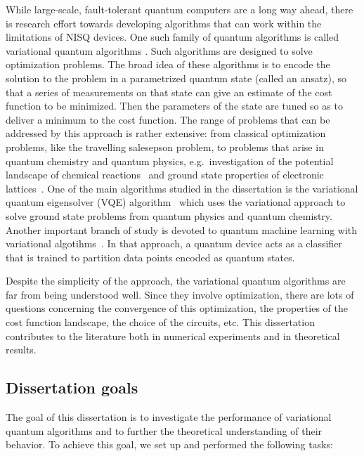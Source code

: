 While large-scale, fault-tolerant quantum computers are a long way ahead, there is research effort towards developing algorithms that can work within the limitations of NISQ devices. One such family of quantum algorithms is called variational quantum algorithms \cite{cerezo_variational_2020}. Such algorithms are designed to solve optimization problems. The broad idea of these algorithms is to encode the solution to the problem in a parametrized quantum state (called an ansatz), so that a series of measurements on that state can give an estimate of the cost function to be minimized. Then the parameters of the state are tuned so as to deliver a minimum to the cost function. The range of problems that can be addressed by this approach is rather extensive: from classical optimization problems, like the travelling salesepson problem, to problems that arise in quantum chemistry and quantum physics, e.g.~investigation of the potential landscape of chemical reactions~\cite{reiher_elucidating_2017} and ground state properties of electronic lattices~\cite{cade_strategies_2019}. One of the main algorithms studied in the dissertation is the variational quantum eigensolver (VQE) algorithm~\cite{peruzzo_variational_2014} which uses the variational approach to solve ground state problems from quantum physics and quantum chemistry. 
Another important branch of study is devoted to quantum machine learning with variational algotihms~\cite{skolik_layerwise_2020,havlicek_supervised_2019,schuld_circuit-centric_2020}. In that approach, a quantum device acts as a classifier that is trained to partition data points encoded as quantum states. 

Despite the simplicity of the approach, the variational quantum algorithms are far from being understood well. Since they involve optimization, there are lots of questions concerning the convergence of this optimization, the properties of the cost function landscape, the choice of the circuits, etc. This dissertation contributes to the literature both in numerical experiments and in theoretical results.

\subsection*{Dissertation goals} 

The goal of this dissertation is to investigate the performance of variational quantum algorithms and to further the theoretical understanding of their behavior. To achieve this goal, we set up and performed the following tasks:


